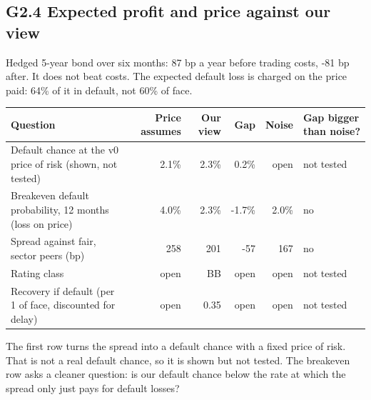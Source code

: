 \documentclass[11pt,a4paper]{article}
\begin{document}
\subsection*{G2.4 Expected profit and price against our view}
Hedged 5-year bond over six months: 87 bp a year before trading costs, -81 bp after. It does not beat costs. The expected default loss is charged on the price paid: 64\% of it in default, not 60\% of face.
\begin{center}\footnotesize\setlength{\tabcolsep}{3.5pt}\begin{tabular}{@{}p{5.2cm}rrrrl@{}}\toprule
Question & Price assumes & Our view & Gap & Noise & Gap bigger than noise? \\\midrule
Default chance at the v0 price of risk (shown, not tested) & 2.1\% & 2.3\% & 0.2\% & open & not tested \\
Breakeven default probability, 12 months (loss on price) & 4.0\% & 2.3\% & -1.7\% & 2.0\% & no \\
Spread against fair, sector peers (bp) & 258 & 201 & -57 & 167 & no \\
Rating class & open & BB & open & open & not tested \\
Recovery if default (per 1 of face, discounted for delay) & open & 0.35 & open & open & not tested \\
\bottomrule\end{tabular}\end{center}
The first row turns the spread into a default chance with a fixed price of risk. That is not a real default chance, so it is shown but not tested. The breakeven row asks a cleaner question: is our default chance below the rate at which the spread only just pays for default losses?
\end{document}
